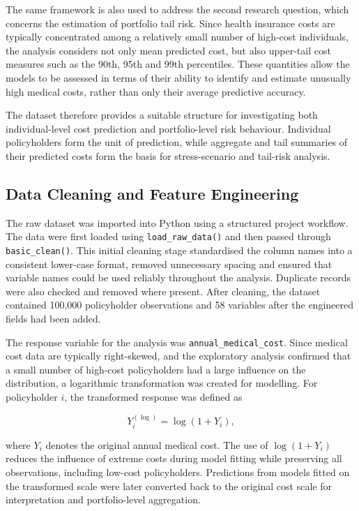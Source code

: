 \documentclass[11pt]{article}
\begin{document}
	The same framework is also used to address the second research question, which concerns the estimation of portfolio tail risk. Since health insurance costs are typically concentrated among a relatively small number of high-cost individuals, the analysis considers not only mean predicted cost, but also upper-tail cost measures such as the 90th, 95th and 99th percentiles. These quantities allow the models to be assessed in terms of their ability to identify and estimate unusually high medical costs, rather than only their average predictive accuracy.
	
	The dataset therefore provides a suitable structure for investigating both individual-level cost prediction and portfolio-level risk behaviour. Individual policyholders form the unit of prediction, while aggregate and tail summaries of their predicted costs form the basis for stress-scenario and tail-risk analysis.
	
	\subsection{Data Cleaning and Feature Engineering}
	
	The raw dataset was imported into Python using a structured project workflow. The data were first loaded using \verb|load_raw_data()| and then passed through \verb|basic_clean()|. This initial cleaning stage standardised the column names into a consistent lower-case format, removed unnecessary spacing and ensured that variable names could be used reliably throughout the analysis. Duplicate records were also checked and removed where present. After cleaning, the dataset contained 100,000 policyholder observations and 58 variables after the engineered fields had been added.
	
	The response variable for the analysis was \verb|annual_medical_cost|. Since medical cost data are typically right-skewed, and the exploratory analysis confirmed that a small number of high-cost policyholders had a large influence on the distribution, a logarithmic transformation was created for modelling. For policyholder \(i\), the transformed response was defined as
	
	\begin{equation}
		Y_i^{(\log)} = \log(1 + Y_i),
	\end{equation}
	
	where \(Y_i\) denotes the original annual medical cost. The use of \(\log(1 + Y_i)\) reduces the influence of extreme costs during model fitting while preserving all observations, including low-cost policyholders. Predictions from models fitted on the transformed scale were later converted back to the original cost scale for interpretation and portfolio-level aggregation.
	
\end{document}
